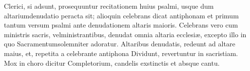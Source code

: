 {\color{red} Clerici, si adsunt, prosequuntur recitationem huius psalmi, usque dum
altariumdenudatio peracta sit; alioquin celebrans dicat antiphonam et primum
tantum versum psalmi ante denudationem altaris maioris. Celebrans vero cum
ministris sacris, velministrantibus, denudat omnia altaria ecclesiæ, excepto
illo in quo Sacramentumsolemniter adoratur. Altaribus denudatis, redeunt ad
altare maius, et, repetita a celebrante antiphona Dividunt, revertuntur in
sacristiam. Mox in choro dicitur Completorium, candelis exstinctis et absque
cantu.}

\newpage





